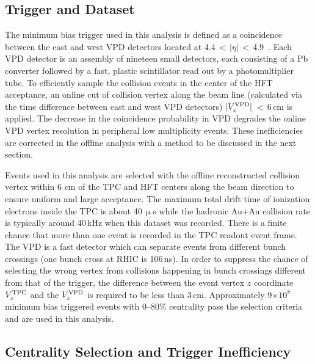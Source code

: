 \documentclass[%
 reprint,	
 amsmath,amssymb,
 aps,
 prc,
]{revtex4-1}
\begin{document}
\subsection{Trigger and Dataset}
\label{dataset:trigger}

The minimum bias trigger used in this analysis is defined as a coincidence between the east and west VPD detectors located at 4.4\,$<$\,$|\eta|$\,$<$\,4.9~\cite{VPD}. Each VPD detector is an assembly of nineteen small detectors, each consisting of a Pb converter followed by a fast, plastic scintillator read out by a photomultiplier tube. To efficiently sample the collision events in the center of the HFT acceptance, an online cut of collision vertex along the beam line (calculated via the time difference between east and west VPD detectors) $|V_z^{\rm VPD}|$\,$<$\,6\,cm is applied. 
The decrease in the coincidence probability in VPD degrades the online VPD vertex resolution in peripheral low multiplicity events. These inefficiencies are corrected in the offline analysis with a method to be discussed in the next section. 

Events used in this analysis are selected with the offline reconstructed collision vertex within 6 cm of the TPC and HFT centers along the beam direction to ensure uniform and large acceptance. The maximum total drift time of ionization electrons inside the TPC is about 40\,$\upmu$s while the hadronic Au+Au collision rate is typically around 40\,kHz when this dataset was recorded. There is a finite chance that more than one event is recorded in the TPC readout event frame. The VPD is a fast detector which can separate events from different bunch crossings (one bunch cross at RHIC is 106\,ns). In order to suppress the chance of selecting the wrong vertex from collisions happening in bunch crossings different from that of the trigger, the difference between the event vertex $z$ coordinate $V_{z}^{\rm TPC}$ and the $V_{z}^{\rm VPD}$ is required to be less than 3\,cm. Approximately 9$\times 10^{8}$ minimum bias triggered events with 0--80\% centrality pass the selection criteria and are used in this analysis.

\subsection{Centrality Selection and Trigger Inefficiency}
\label{dataset:Centrality}
\end{document}
